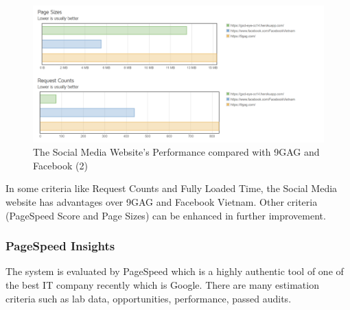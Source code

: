 \begin{center}
    \begin{figure}[H]
    \centering
    \includegraphics[width=1\columnwidth]{images/chap5/gtmetrix-graph-2.PNG}
    \caption{The Social Media Website's Performance compared with 9GAG and Facebook (2)}
    \end{figure}
\end{center}

In some criteria like Request Counts and Fully Loaded Time, the Social Media website has advantages over 9GAG and Facebook Vietnam. Other criteria (PageSpeed Score and Page Sizes) can be enhanced in further improvement.

\subsubsection{PageSpeed Insights}
The system is evaluated by PageSpeed which is a highly authentic tool of one of the best IT company recently which is Google. There are many estimation criteria such as lab data, opportunities, performance, passed audits. 

